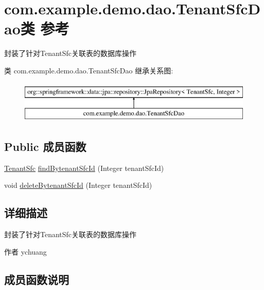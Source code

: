 \hypertarget{interfacecom_1_1example_1_1demo_1_1dao_1_1_tenant_sfc_dao}{}\section{com.\+example.\+demo.\+dao.\+Tenant\+Sfc\+Dao类 参考}
\label{interfacecom_1_1example_1_1demo_1_1dao_1_1_tenant_sfc_dao}


封装了针对\+Tenant\+Sfc关联表的数据库操作  


类 com.\+example.\+demo.\+dao.\+Tenant\+Sfc\+Dao 继承关系图\+:\begin{figure}[H]
\begin{center}
\leavevmode
\includegraphics[height=2.000000cm]{interfacecom_1_1example_1_1demo_1_1dao_1_1_tenant_sfc_dao}
\end{center}
\end{figure}
\subsection*{Public 成员函数}
\begin{DoxyCompactItemize}
\item 
\mbox{\hyperlink{classcom_1_1example_1_1demo_1_1modular_1_1_tenant_sfc}{Tenant\+Sfc}} \mbox{\hyperlink{interfacecom_1_1example_1_1demo_1_1dao_1_1_tenant_sfc_dao_a765f6fbc616361a989a1c1bb8e2265ba}{find\+Bytenant\+Sfc\+Id}} (Integer tenant\+Sfc\+Id)
\item 
void \mbox{\hyperlink{interfacecom_1_1example_1_1demo_1_1dao_1_1_tenant_sfc_dao_a2502cecc2d2088e393a420912d373675}{delete\+Bytenant\+Sfc\+Id}} (Integer tenant\+Sfc\+Id)
\end{DoxyCompactItemize}


\subsection{详细描述}
封装了针对\+Tenant\+Sfc关联表的数据库操作 

\begin{DoxyAuthor}{作者}
ychuang 
\end{DoxyAuthor}


\subsection{成员函数说明}
\mbox{\label{interfacecom_1_1example_1_1demo_1_1dao_1_1_tenant_sfc_dao_a2502cecc2d2088e393a420912d373675}} 
